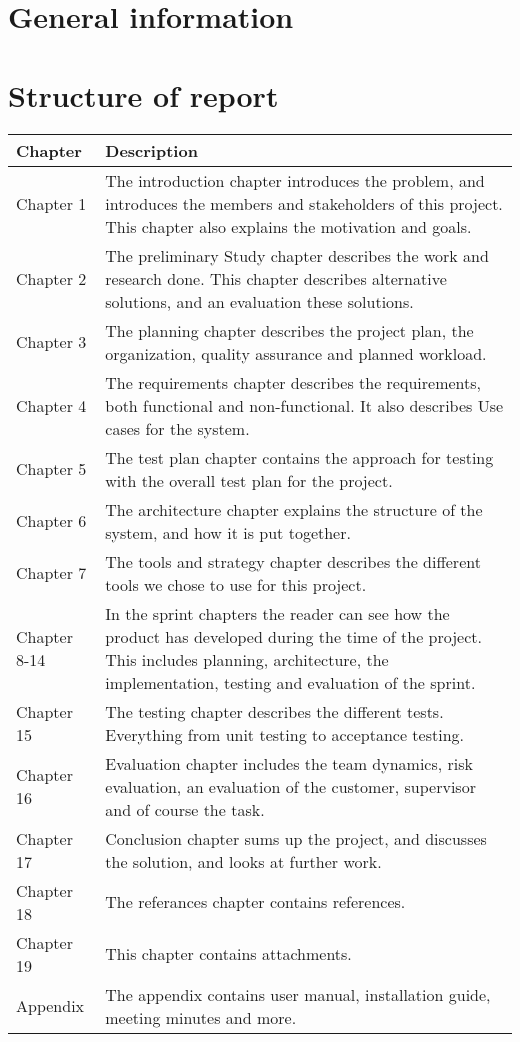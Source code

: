 \section{General information}

\section{Structure of report}
\begin{tabular}{l|p{10cm}}
\textbf{Chapter} & \textbf{Description} \\
\hline
Chapter 1 & The introduction chapter introduces the problem, and introduces the members and stakeholders of this project.
This chapter also explains the motivation and goals. \\
\hline
Chapter 2 &  The preliminary Study chapter describes the work and research done. This chapter describes alternative solutions, and an evaluation these solutions. \\
\hline
Chapter 3 &  The planning chapter describes the project plan, the organization, quality assurance and planned workload.  \\
\hline
Chapter 4 &  The requirements chapter describes the requirements, both functional and non-functional. It also describes Use cases for the system. \\
\hline
Chapter 5 &  The test plan chapter contains the approach for testing with the overall test plan for the project.\\
\hline
Chapter 6	 &  The architecture chapter explains the structure of the system, and how it is put together. \\
\hline
Chapter 7	 &   The tools and strategy chapter describes the different tools we chose to use for this project.\\
\hline
Chapter 8-14 	&  In the sprint chapters the reader can see how the product has developed during the time of the project. This includes planning, architecture, the implementation, testing and evaluation of the sprint. \\
\hline
Chapter 15 	 &  The testing chapter describes the different tests. Everything from unit testing to acceptance testing. \\
\hline
Chapter 16 	 &  Evaluation chapter includes the team dynamics, risk evaluation, an evaluation of the customer, supervisor and of course the task. \\
\hline
Chapter 17 	 &  Conclusion chapter sums up the project, and discusses the solution, and looks at further work. \\
\hline
Chapter 18 	 &  The referances chapter contains references. \\
\hline
Chapter 19 	 &  This chapter contains attachments. \\
\hline
Appendix 	 &   The appendix contains user manual, installation guide, meeting minutes and more.\\

\hline
\end{tabular}
